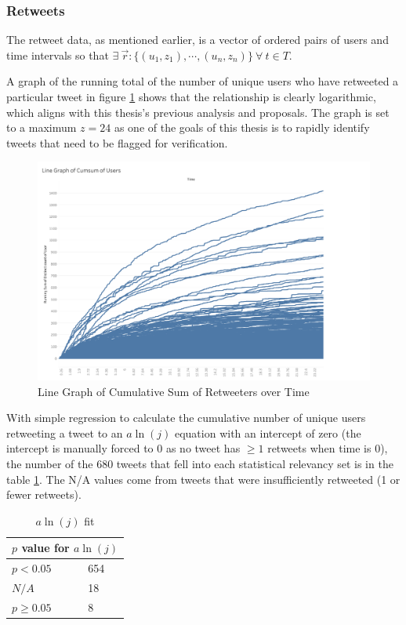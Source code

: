 \documentclass[preprint,review,12pt]{elsarticle}
\begin{document}
\subsubsection{Retweets}
The retweet data, as mentioned earlier, is a vector of ordered pairs of users and time intervals so that $ \exists \ \vec{r}:\{(u_1,z_1), \cdots, (u_n,z_n)\} \ \forall \ t \in T$.

A graph of the running total of the number of unique users who have retweeted a particular tweet in figure \ref{fig:Users CumSum/Time} shows that the relationship is clearly logarithmic, which aligns with this thesis's previous analysis and proposals. The graph is set to a maximum $z = 24$ as one of the goals of this thesis is to rapidly identify tweets that need to be flagged for verification.
\begin{figure}[h!]
 \centering
  \includegraphics[width=12cm]{Linegraph cumsum users.png}
  \caption{Line Graph of Cumulative Sum of Retweeters over Time}\label{fig:Users CumSum/Time}
 \end{figure}

With simple regression to calculate the cumulative number of unique users retweeting a tweet to an $a\ln(j)$ equation with an intercept of zero (the intercept is manually forced to 0 as no tweet has $\geq 1$ retweets when time is 0), the number of the 680 tweets that fell into each statistical relevancy set is in the table \ref{Natural Log Fit}. The N/A values come from tweets that were insufficiently retweeted (1 or fewer retweets).   
\begin{table}[h!]
\centering
\begin{tabular}{ |p{3cm}|p{3cm}|  }
\hline
\multicolumn{2}{|c|}{$p$ value for $a\ln(j)$} \\
\hline
$p < 0.05$  & 654\\
$N/A$ & 18 \\
$ p \geq 0.05$ & 8 \\
\hline
\end{tabular}
\caption{$a\ln(j)$ fit}
\label{Natural Log Fit}
\end{table}
\end{document}
